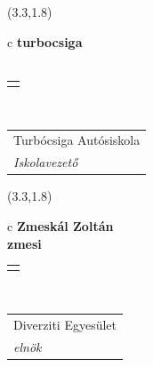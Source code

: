 \documentclass[11pt]{article}
\begin{document}
\makebox(3.3,1.8){
  \renewcommand\arraystretch{1.3}
  \begin{tabular}[c]{c}
    \hspace{8.5mm}
    \LARGE\bf{ turbocsiga }\\
    \hspace{8.5mm}
    \Large{  }\\
    \renewcommand\arraystretch{3}
    \begin{tabular}[c]{c}
      \centering
      \fontfamily{phv}\selectfont{
        \textbf{
          \textsc{
            \scriptsize{
            \color{Dark}{ Ismerkedő }\color{Dark}{ Webmester }\color{Bright}{ Sminkmester }\color{Bright}{ Programozó }
            }
          }
        }
      }
    \end{tabular}
    \\
    \renewcommand\arraystretch{1}
    \begin{tabular}{p{3.3in}}
      \hspace{.7cm}Turbócsiga Autósiskola\\
      \hspace{.7cm}\emph{ Iskolavezető }\\
    \end{tabular}
  \end{tabular}
}

\makebox(3.3,1.8){
  \renewcommand\arraystretch{1.3}
  \begin{tabular}[c]{c}
    \hspace{8.5mm}
    \LARGE\bf{ Zmeskál Zoltán }\\
    \hspace{8.5mm}
    \Large{ zmesi }\\
    \renewcommand\arraystretch{3}
    \begin{tabular}[c]{c}
      \centering
      \fontfamily{phv}\selectfont{
        \textbf{
          \textsc{
            \scriptsize{
            \color{Bright}{ Ismerkedő }\color{Dark}{ Webmester }\color{Bright}{ Sminkmester }\color{Bright}{ Programozó }
            }
          }
        }
      }
    \end{tabular}
    \\
    \renewcommand\arraystretch{1}
    \begin{tabular}{p{3.3in}}
      \hspace{.7cm}Diverziti Egyesület\\
      \hspace{.7cm}\emph{ elnök }\\
    \end{tabular}
  \end{tabular}
}
\end{document}
